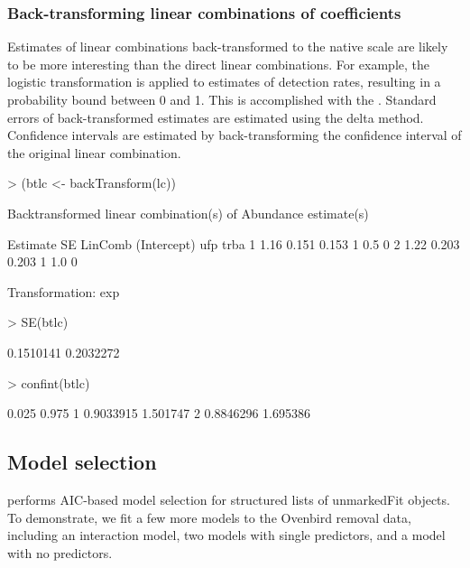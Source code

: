 \documentclass[article,shortnames]{jss}
\begin{document}
{\subsubsection{Back-transforming linear combinations of coefficients}

Estimates of linear combinations back-transformed to the native scale
are likely to be more interesting than the direct linear combinations.
For example, the logistic transformation is applied to estimates of
detection rates, resulting in a probability bound between 0 and
1. This is accomplished with the .  Standard
errors of back-transformed estimates are estimated using the delta
method.  Confidence intervals are estimated by back-transforming the
confidence interval of the original linear combination.

\begin{Schunk}
\begin{Sinput}
> (btlc <- backTransform(lc))
\end{Sinput}
\begin{Soutput}
Backtransformed linear combination(s) of Abundance estimate(s)

  Estimate    SE LinComb (Intercept) ufp trba
1     1.16 0.151   0.153           1 0.5    0
2     1.22 0.203   0.203           1 1.0    0

Transformation: exp 
\end{Soutput}
\begin{Sinput}
> SE(btlc)
\end{Sinput}
\begin{Soutput}
[1] 0.1510141 0.2032272
\end{Soutput}
\begin{Sinput}
> confint(btlc)
\end{Sinput}
\begin{Soutput}
      0.025    0.975
1 0.9033915 1.501747
2 0.8846296 1.695386
\end{Soutput}
\end{Schunk}

\subsection{Model selection} 

 performs AIC-based model selection for structured lists of 
unmarkedFit objects.  To demonstrate, we fit a few more models to the Ovenbird
removal data, including an interaction model, two models with
single predictors, and a model with no predictors.

}
\end{document}

